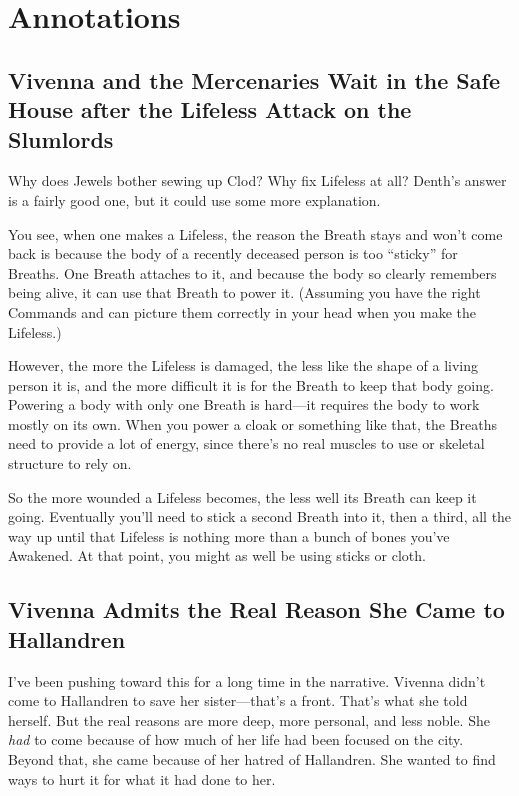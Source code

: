 \section*{Annotations}

\subsection*{Vivenna and the Mercenaries Wait in the Safe House after the Lifeless Attack on the Slumlords}

Why does Jewels bother sewing up Clod? Why fix Lifeless at all? Denth’s answer is a fairly good one, but it could use some more explanation.

You see, when one makes a Lifeless, the reason the Breath stays and won’t come back is because the body of a recently deceased person is too “sticky” for Breaths. One Breath attaches to it, and because the body so clearly remembers being alive, it can use that Breath to power it. (Assuming you have the right Commands and can picture them correctly in your head when you make the Lifeless.)

However, the more the Lifeless is damaged, the less like the shape of a living person it is, and the more difficult it is for the Breath to keep that body going. Powering a body with only one Breath is hard—it requires the body to work mostly on its own. When you power a cloak or something like that, the Breaths need to provide a lot of energy, since there’s no real muscles to use or skeletal structure to rely on.

So the more wounded a Lifeless becomes, the less well its Breath can keep it going. Eventually you’ll need to stick a second Breath into it, then a third, all the way up until that Lifeless is nothing more than a bunch of bones you’ve Awakened. At that point, you might as well be using sticks or cloth.

\subsection*{Vivenna Admits the Real Reason She Came to Hallandren}

I’ve been pushing toward this for a long time in the narrative. Vivenna didn’t come to Hallandren to save her sister—that’s a front. That’s what she told herself. But the real reasons are more deep, more personal, and less noble. She \textit{had} to come because of how much of her life had been focused on the city. Beyond that, she came because of her hatred of Hallandren. She wanted to find ways to hurt it for what it had done to her.

